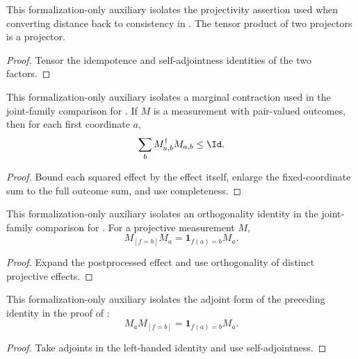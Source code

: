 \begin{lemma}
	\label{lem:sandwich-tensor-projector}
	\leanok
	This formalization-only auxiliary isolates the projectivity assertion used
	when converting distance back to consistency in
	\cite[Fact~4.34]{Natarajan2018NEEXP}. The tensor product of two projectors is a projector.
\end{lemma}
\begin{proof}
	\leanok
	Tensor the idempotence and self-adjointness identities of the two factors.
\end{proof}

\begin{lemma}
	\label{lem:sandwich-pair-fiber-sum}
	\leanok
	This formalization-only auxiliary isolates a marginal contraction used in the
	joint-family comparison for \cite[Fact~4.34]{Natarajan2018NEEXP}. If $M$ is a measurement
	with pair-valued outcomes, then for each first coordinate $a$,
	\[
		\sum_b M_{a,b}^\dagger M_{a,b}\leq\Id.
	\]
\end{lemma}
\begin{proof}
	\leanok
	Bound each squared effect by the effect itself, enlarge the fixed-coordinate
	sum to the full outcome sum, and use completeness.
\end{proof}

\begin{lemma}
	\label{lem:sandwich-postprocess-effect-left}
	\leanok
	This formalization-only auxiliary isolates an orthogonality identity in the
	joint-family comparison for \cite[Fact~4.34]{Natarajan2018NEEXP}. For a projective
	measurement $M$,
	\[
		M_{[f=b]}M_a=\mathbf 1_{f(a)=b}M_a.
	\]
\end{lemma}
\begin{proof}
	\leanok
	Expand the postprocessed effect and use orthogonality of distinct projective
	effects.
\end{proof}

\begin{lemma}
	\label{lem:sandwich-postprocess-effect-right}
	\leanok
	This formalization-only auxiliary isolates the adjoint form of the preceding
	identity in the proof of \cite[Fact~4.34]{Natarajan2018NEEXP}:
	\[
		M_aM_{[f=b]}=\mathbf 1_{f(a)=b}M_a.
	\]
\end{lemma}
\begin{proof}
	\leanok
	Take adjoints in the left-handed identity and use self-adjointness.
\end{proof}

